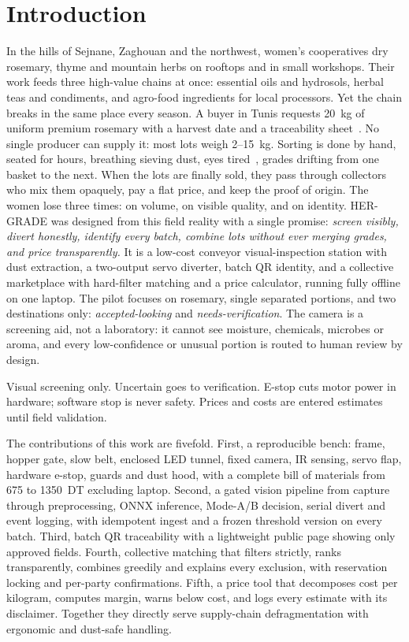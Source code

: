 \documentclass[10pt,conference,a4paper]{IEEEtran}
\begin{document}
\section{Introduction}
In the hills of Sejnane, Zaghouan and the northwest, women's cooperatives dry rosemary, thyme and mountain herbs on rooftops and in small workshops. Their work feeds three high-value chains at once: essential oils and hydrosols, herbal teas and condiments, and agro-food ingredients for local processors. Yet the chain breaks in the same place every season. A buyer in Tunis requests 20~kg of uniform premium rosemary with a harvest date and a traceability sheet~\cite{challenge2026}. No single producer can supply it: most lots weigh 2--15~kg. Sorting is done by hand, seated for hours, breathing sieving dust, eyes tired~\cite{ilo2021}, grades drifting from one basket to the next. When the lots are finally sold, they pass through collectors who mix them opaquely, pay a flat price, and keep the proof of origin. The women lose three times: on volume, on visible quality, and on identity.
HER-GRADE was designed from this field reality with a single promise: \textit{screen visibly, divert honestly, identify every batch, combine lots without ever merging grades, and price transparently.} It is a low-cost conveyor visual-inspection station with dust extraction, a two-output servo diverter, batch QR identity, and a collective marketplace with hard-filter matching and a price calculator, running fully offline on one laptop. The pilot focuses on rosemary, single separated portions, and two destinations only: \textit{accepted-looking} and \textit{needs-verification}. The camera is a screening aid, not a laboratory: it cannot see moisture, chemicals, microbes or aroma, and every low-confidence or unusual portion is routed to human review by design.
\begin{tcolorbox}[colback=lightbg,colframe=hergreen,title=Design contract (printed on every screen and box),fonttitle=\bfseries\small]
Visual screening only. Uncertain goes to verification. E-stop cuts motor power in hardware; software stop is never safety. Prices and costs are entered estimates until field validation.
\end{tcolorbox}
The contributions of this work are fivefold. First, a reproducible bench: frame, hopper gate, slow belt, enclosed LED tunnel, fixed camera, IR sensing, servo flap, hardware e-stop, guards and dust hood, with a complete bill of materials from 675 to 1350~DT excluding laptop. Second, a gated vision pipeline from capture through preprocessing, ONNX inference, Mode-A/B decision, serial divert and event logging, with idempotent ingest and a frozen threshold version on every batch. Third, batch QR traceability with a lightweight public page showing only approved fields. Fourth, collective matching that filters strictly, ranks transparently, combines greedily and explains every exclusion, with reservation locking and per-party confirmations. Fifth, a price tool that decomposes cost per kilogram, computes margin, warns below cost, and logs every estimate with its disclaimer. Together they directly serve supply-chain defragmentation with ergonomic and dust-safe handling.
\end{document}

